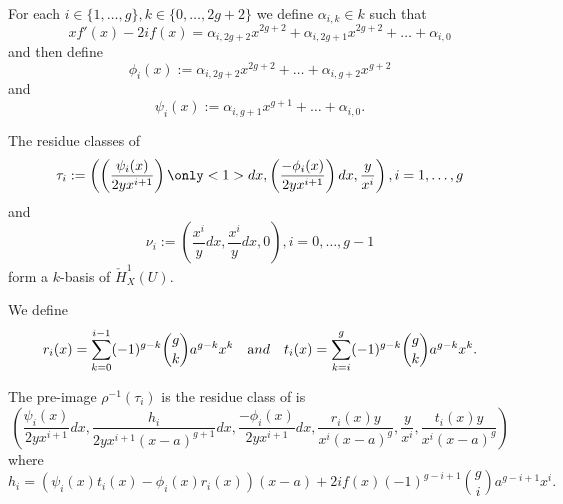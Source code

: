 \documentclass{beamer}
\begin{document}
\begin{frame}
For each $i \in \{1, \ldots, g\}, k \in \{0, \ldots , 2g+2\}$ we define $\alpha_{i,k}\in k$ such that
\[
xf'(x) - 2if(x) = \alpha_{i,2g+2}x^{2g+2} + \alpha_{i, 2g+1}x^{2g+2} + \ldots + \alpha_{i,0}
\]
and then define
\[
\phi_i(x)  := \alpha_{i,2g+2}x^{2g+2} + \ldots + \alpha_{i,g+2}x^{g+2} 
\]
and
\[
\psi_i(x) := \alpha_{i,g+1}x^{g+1} + \ldots + \alpha_{i,0}.
\]
\pause
\begin{theorem}
The residue classes of
\[
\tau_i := \left( \left( \frac{\psi_i(x)}{2yx^{i+1}} \right) \only<1>{dx}, \left(\frac{-\phi_i(x)}{2yx^{i+1}} \right)dx, \frac{y}{x^i} \right), i= 1, \ldots, g
\]
and
\[
\nu_i := \left( \frac{x^i}{y}dx, \frac{x^i}{y}dx, 0 \right), i = 0, \ldots, g-1
\]
form a $k$-basis of $\check{H}^1_X(U)$.
\end{theorem}
\end{frame}

\begin{frame}
We define 
\[
r_i(x) = \sum_{k=0}^{i-1} (-1)^{g-k} \binom{g}{k} a^{g-k}x^k \quad {\text and} \quad t_i(x) = \sum_{k=i}^g (-1)^{g-k}\binom{g}{k} a^{g-k}x^k.
\]
\begin{theorem}
The pre-image $\rho^{-1}(\tau_i)$ is the residue class of is
\begin{equation*}
\left( \frac{\psi_i(x)}{2yx^{i+1}}dx, \frac{h_i}{2yx^{i+1}(x-a)^{g+1}}dx, \frac{-\phi_i(x)}{2yx^{i+1}}dx, \frac{r_i(x)y}{x^i(x-a)^g}, \frac{y}{x^i}, \frac{t_i(x)y}{x^i(x-a)^g} \right)
\end{equation*}
where
\[
h_i = 
(\psi_i(x)t_i(x) - \phi_i(x)r_i(x))(x-a) + 2if(x)(-1)^{g-i+1}\binom{g}{i}a^{g-i+1}x^i.
\]
\end{theorem}

\end{frame}
%
%
%
%
%
%
%
%
\end{document}
